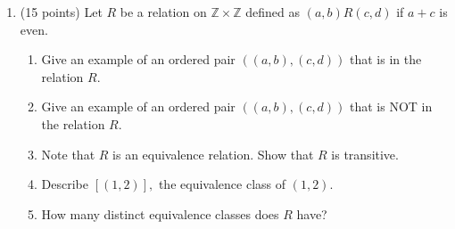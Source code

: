 \documentclass{amsart}
\newcommand{\z}{\mathbb{Z}}
\begin{document}
\begin{enumerate}
\item (15 points) Let $R$ be a relation on $\z \times \z$ defined as
$(a,b) R (c,d)$ if $a+c$ is even.
\begin{enumerate}
\item Give an example of an ordered pair $((a,b),(c,d))$ that is in
the relation $R.$ \vfill

\item Give an example of an ordered pair $((a,b),(c,d))$ that is NOT in
the relation $R.$ \vfill

\item Note that $R$ is an equivalence relation. Show that $R$ is
transitive.\vfill

\item Describe $[(1,2)],$ the equivalence class of $(1,2).$ \vfill

\item How many distinct equivalence classes does $R$ have? \vfill
\end{enumerate} \newpage

\end{enumerate}
\end{document}
